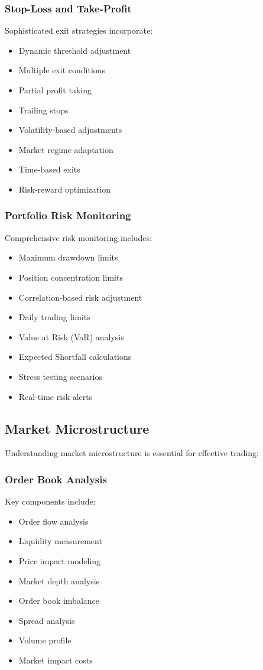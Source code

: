 \documentclass[conference]{IEEEtran}
\begin{document}
\subsubsection{Stop-Loss and Take-Profit}
Sophisticated exit strategies incorporate:
\begin{itemize}
    \item Dynamic threshold adjustment
    \item Multiple exit conditions
    \item Partial profit taking
    \item Trailing stops
    \item Volatility-based adjustments
    \item Market regime adaptation
    \item Time-based exits
    \item Risk-reward optimization
\end{itemize}

\subsubsection{Portfolio Risk Monitoring}
Comprehensive risk monitoring includes:
\begin{itemize}
    \item Maximum drawdown limits
    \item Position concentration limits
    \item Correlation-based risk adjustment
    \item Daily trading limits
    \item Value at Risk (VaR) analysis
    \item Expected Shortfall calculations
    \item Stress testing scenarios
    \item Real-time risk alerts
\end{itemize}

\subsection{Market Microstructure}
Understanding market microstructure is essential for effective trading:

\subsubsection{Order Book Analysis}
Key components include:
\begin{itemize}
    \item Order flow analysis
    \item Liquidity measurement
    \item Price impact modeling
    \item Market depth analysis
    \item Order book imbalance
    \item Spread analysis
    \item Volume profile
    \item Market impact costs
\end{itemize}
\end{document}
